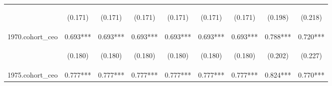 \begin{center}
\begin{tabular}{lcccccccc}
\vspace{4pt} & \begin{footnotesize}(0.171)\end{footnotesize} & \begin{footnotesize}(0.171)\end{footnotesize} & \begin{footnotesize}(0.171)\end{footnotesize} & \begin{footnotesize}(0.171)\end{footnotesize} & \begin{footnotesize}(0.171)\end{footnotesize} & \begin{footnotesize}(0.171)\end{footnotesize} & \begin{footnotesize}(0.198)\end{footnotesize} & \begin{footnotesize}(0.218)\end{footnotesize} \\
1970.cohort\_ceo & 0.693*** & 0.693*** & 0.693*** & 0.693*** & 0.693*** & 0.693*** & 0.788*** & 0.720*** \\
\vspace{4pt} & \begin{footnotesize}(0.180)\end{footnotesize} & \begin{footnotesize}(0.180)\end{footnotesize} & \begin{footnotesize}(0.180)\end{footnotesize} & \begin{footnotesize}(0.180)\end{footnotesize} & \begin{footnotesize}(0.180)\end{footnotesize} & \begin{footnotesize}(0.180)\end{footnotesize} & \begin{footnotesize}(0.202)\end{footnotesize} & \begin{footnotesize}(0.227)\end{footnotesize} \\
1975.cohort\_ceo & 0.777*** & 0.777*** & 0.777*** & 0.777*** & 0.777*** & 0.777*** & 0.824*** & 0.770*** \\

\end{tabular}
\end{center}
